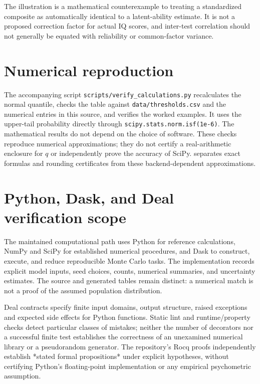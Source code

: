 The illustration is a mathematical counterexample to treating a
standardized composite as automatically identical to a latent-ability
estimate. It is not a proposed correction factor for actual IQ scores,
and inter-test correlation should not generally be equated with reliability
or common-factor variance.

\chapter{Numerical reproduction}

The accompanying script \texttt{scripts/verify\_calculations.py} recalculates
the normal quantile, checks the table against \texttt{data/thresholds.csv}
and the numerical entries in this source, and verifies the worked examples.
It uses the upper-tail probability directly through
\texttt{scipy.stats.norm.isf(1e-6)}. The mathematical results do not depend
on the choice of software.
These checks reproduce numerical approximations; they do not certify a
real-arithmetic enclosure for \(q\) or independently prove the accuracy
of SciPy.  separates exact formulas and rounding
certificates from these backend-dependent approximations.

\chapter{Python, Dask, and Deal verification scope}
\label{sec:verification}
The maintained computational path uses Python for reference calculations,
NumPy and SciPy for established numerical procedures, and Dask to construct,
execute, and reduce reproducible Monte Carlo tasks. The implementation
records explicit model inputs, seed choices, counts, numerical summaries,
and uncertainty estimates. The source and generated tables remain distinct:
a numerical match is not a proof of the assumed population distribution.

Deal contracts specify finite input domains, output structure, raised
exceptions and expected side effects for Python functions. Static lint and
runtime/property checks detect particular classes of mistakes; neither the
number of decorators nor a successful finite test establishes the
correctness of an unexamined numerical library or a pseudorandom generator.
The repository's Rocq proofs independently establish *stated formal
propositions* under explicit hypotheses, without certifying Python's
floating-point implementation or any empirical psychometric assumption.


